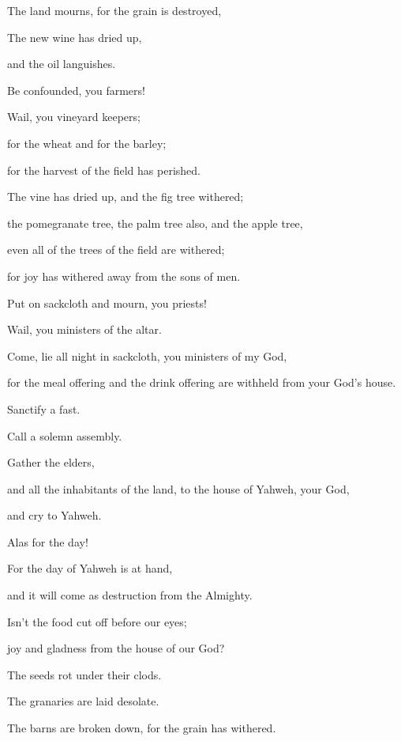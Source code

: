 {\par }{\QB The land mourns, for the grain is destroyed,
\par }{\QB The new wine has dried up,
\par }{\QB and the oil languishes.
\par }{\Q {}Be confounded, you farmers!
\par }{\QB Wail, you vineyard keepers;
\par }{\QB for the wheat and for the barley;
\par }{\QB for the harvest of the field has perished.
\par }{\Q {}The vine has dried up, and the fig tree withered;
\par }{\QB the pomegranate tree, the palm tree also, and the apple tree,
\par }{\QB even all of the trees of the field are withered;
\par }{\QB for joy has withered away from the sons of men.
\par }{\Q {}Put on sackcloth and mourn, you priests!
\par }{\QB Wail, you ministers of the altar.
\par }{\Q Come, lie all night in sackcloth, you ministers of my God,
\par }{\QB for the meal offering and the drink offering are withheld from your God’s house.
\par }{\Q {}Sanctify a fast.
\par }{\QB Call a solemn assembly.
\par }{\QB Gather the elders,
\par }{\QB and all the inhabitants of the land, to the house of Yahweh, your God,
\par }{\QB and cry to Yahweh.
\par }{\Q {}Alas for the day!
\par }{\QB For the day of Yahweh is at hand,
\par }{\QB and it will come as destruction from the Almighty.
\par }{\Q {}Isn’t the food cut off before our eyes;
\par }{\QB joy and gladness from the house of our God?
\par }{\Q {}The seeds rot under their clods.
\par }{\QB The granaries are laid desolate.
\par }{\QB The barns are broken down, for the grain has withered.
}
